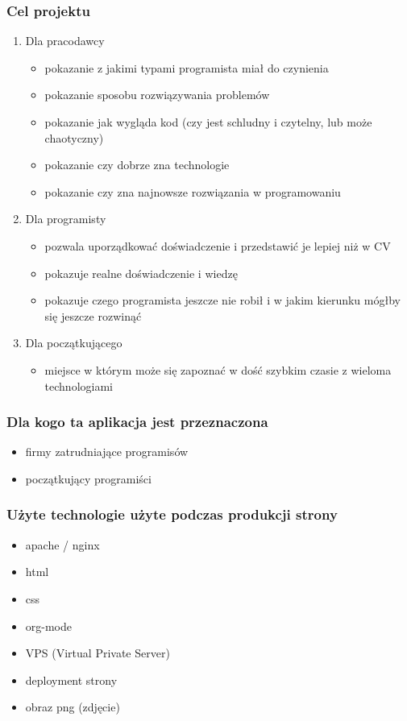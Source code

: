 \documentclass[11pt]{article}
\begin{document}
\subsubsection{Cel projektu}
\label{sec:org4deb373}
\begin{enumerate}
\item Dla pracodawcy
\label{sec:org3bf2ac0}
\begin{itemize}
\item pokazanie z jakimi typami programista miał do czynienia
\item pokazanie sposobu rozwiązywania problemów
\item pokazanie jak wygląda kod (czy jest schludny i czytelny, lub może chaotyczny)
\item pokazanie czy dobrze zna technologie
\item pokazanie czy zna najnowsze rozwiązania w programowaniu
\end{itemize}
\item Dla programisty
\label{sec:org13e76d4}
\begin{itemize}
\item pozwala uporządkować doświadczenie i przedstawić je lepiej niż w CV
\item pokazuje realne doświadczenie i wiedzę
\item pokazuje czego programista jeszcze nie robił i w jakim kierunku mógłby się jeszcze rozwinąć
\end{itemize}
\item Dla początkującego
\label{sec:org089f731}
\begin{itemize}
\item miejsce w którym może się zapoznać w dość szybkim czasie z wieloma technologiami
\end{itemize}
\end{enumerate}
\subsubsection{Dla kogo ta aplikacja jest przeznaczona}
\label{sec:org8bdfb58}
\begin{itemize}
\item firmy zatrudniające programisów
\item początkujący programiści
\end{itemize}
\subsubsection{Użyte technologie użyte podczas produkcji strony}
\label{sec:org82dbcb5}
\begin{itemize}
\item apache / nginx
\item html
\item css
\item org-mode
\item VPS (Virtual Private Server)
\item deployment strony
\item obraz png (zdjęcie)
\end{itemize}
\end{document}
